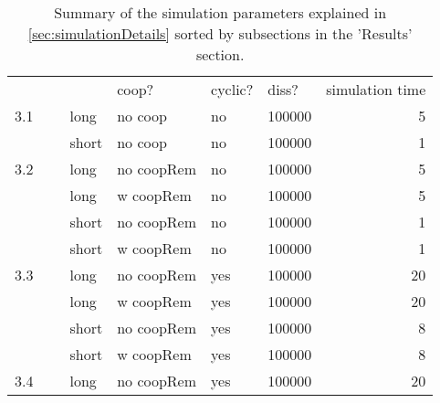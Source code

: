 \begin{table}[htbp!]
    \caption{Summary of the simulation parameters explained in \ref{sec:simulationDetails} sorted by subsections in the 'Results' section.}
    \centering
    \begin{tabular}{lllllrr}
                                &   &                               & coop?          & cyclic? & \multicolumn{1}{l}{diss?} & \multicolumn{1}{l}{simulation time}  \\
        \multicolumn{1}{r}{3.1} & ~ & long                          & no coop        & no      & 100000                    & 5                                    \\
        ~                       & ~ & short                         & no coop        & no      & 100000                    & 1                                    \\
        \multicolumn{1}{r}{3.2} & ~ & long                          & no coopRem     & no      & 100000                    & 5                                    \\
        ~                       & ~ & long                          & w coopRem      & no      & 100000                    & 5                                    \\
        ~                       & ~ & short                         & no coopRem     & no      & 100000                    & 1                                    \\
        ~                       & ~ & short                         & w coopRem      & no      & 100000                    & 1                                    \\
        \multicolumn{1}{r}{3.3} & ~ & long                          & no coopRem     & yes     & 100000                    & 20                                   \\
        ~                       & ~ & long                          & w coopRem      & yes     & 100000                    & 20                                   \\
        ~                       & ~ & short                         & no coopRem     & yes     & 100000                    & 8                                    \\
        ~                       & ~ & short                         & w coopRem      & yes     & 100000                    & 8                                    \\
        \multicolumn{1}{r}{3.4} & ~ & long                          & no coopRem     & yes     & 100000                    & 20                                   \\

\end{tabular}
\end{table}
